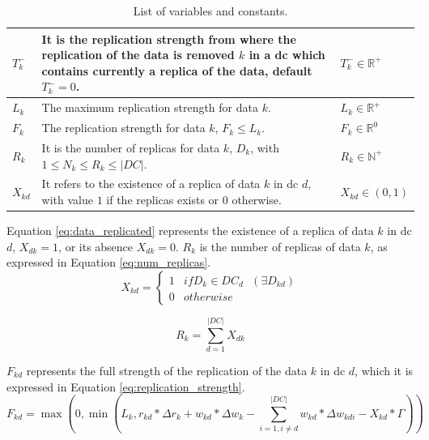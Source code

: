 \documentclass[english]{article}
\begin{document}
\begin{table}[ht!]
\begin{tabular}{ |l|p{7.8cm}|l|}
		\hline
		$T^{-}_{k}$       & It is the replication strength from where the replication of the data is removed $k$ in a \gls{dc} which contains currently a replica of the data, default $T^{-}_{k} = 0$. & $T^{-}_{k} \in \mathbb{R}^{+}$ \\
		\hline
		$L_{k}$            & The maximum replication strength for data $k$. & $L_{k} \in \mathbb{R}^{+}$ \\
		\hline
		$F_{k}$            & The replication strength for data $k$, $F_{k} \le L_{k}$. & $F_{k} \in \mathbb{R}^{0}$ \\
		\hline
		$R_{k}$            & It is the number of replicas for data $k$, $D_{k}$, with $1 \le N_{k} \le R_{k} \le |DC|$. & $R_{k} \in \mathbb{N}^{+}$ \\
		\hline
		$X_{kd}$            & It refers to the existence of a replica of data $k$ in \gls{dc} $d$, with value $1$ if the replicas exists or $0$ otherwise. & $X_{kd} \in (0, 1)$\\
		\hline
	\end{tabular}
	
	\caption{List of variables and constants.}
	\label{tbl:vars_consts}
\end{table}

Equation \ref{eq:data_replicated} represents the existence of a replica of data $k$ in \gls{dc} $d$, $X_{dk} = 1$, or its absence $X_{dk} = 0$. $R_{k}$ is the number of replicas of data $k$, as expressed in Equation \ref{eq:num_replicas}.
\begin{equation} \label{eq:data_replicated}
	X_{kd} = \left\{
		\begin{array}{ll}
			1 & if D_{k} \in DC_{d} \text{ } (\exists D_{kd})\\
			0 & otherwise
		\end{array}
	\right.
\end{equation}

\begin{equation} \label{eq:num_replicas}
R_{k} = \sum^{|DC|}_{d = 1} X_{dk}
\end{equation}

$F_{kd}$ represents the full strength of the replication of the data $k$ in \gls{dc} $d$, which it is expressed in Equation \ref{eq:replication_strength}.
\begin{equation}  \label{eq:replication_strength}
	 F_{kd} = \max(0, \min(L_{k}, r_{kd} * \Delta r_{k} + w_{kd} * \Delta w_{k} - \sum^{|DC|}_{i = 1, i \neq d} w_{kd} * \Delta w_{kdi} - X_{kd} * \Gamma))
\end{equation}
\end{document}
